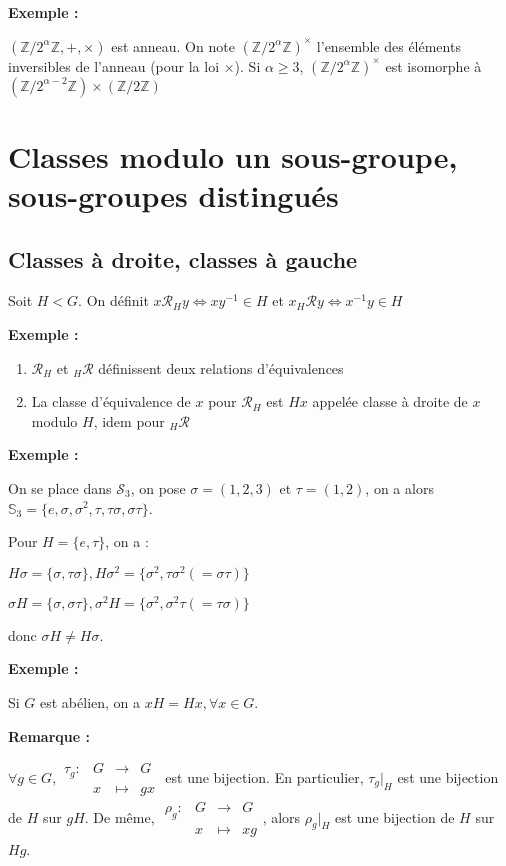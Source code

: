 \documentclass{report}
\newenvironment{exemple}{\begin{tcolorbox}[colback=gray!10,colframe= white]
    \textbf{Exemple :}
     \par}
    {\end{tcolorbox}}
\newcommand{\remarque}{
    \noindent\textbf{Remarque :} \par
}
\newcommand{\fonction}[5]{
    \begin{array}{l|rcl}
    #1: & #2 & \longrightarrow & #3 \\
        & #4 & \longmapsto & #5 
    \end{array}
}
\newcommand{\Z}{\mathbb{Z}}
\begin{document}
\begin{exemple}
$(\Z / 2^{\alpha}\Z,+,\times)$ est anneau. On note $(\Z / 2^{\alpha}\Z)^{\times}$ l'ensemble des éléments inversibles de l'anneau (pour la loi $\times$). Si $\alpha \ge 3$, $(\Z / 2^{\alpha}\Z)^{\times}$ est isomorphe à $(\Z /2^{\alpha -2}\Z)\times(\Z / 2\Z)$
\end{exemple}

\chapter{Classes modulo un sous-groupe, sous-groupes distingués}


\section{Classes à droite, classes à gauche}

Soit $H < G$. On définit $x\mathcal{R}_H y \iff xy^{-1} \in H$ et $x _{H}\mathcal{R} y \iff x^{-1}y \in H$

\begin{exemple}
\begin{enumerate}
    \item $\mathcal{R}_H$ et $_{H}\mathcal{R}$ définissent deux relations d'équivalences
\item La classe d'équivalence de $x$ pour $\mathcal{R}_H$ est $Hx$ appelée classe à droite de $x$ modulo $H$, idem pour $_{H}\mathcal{R}$
\end{enumerate}
\end{exemple}

\begin{exemple}
	On se place dans $\mathcal{S}_3$, on pose $\sigma=(1,2,3)$ et $\tau=(1,2)$, on a alors $\mathbb{S}_3 = \{e,\sigma,\sigma^2,\tau,\tau\sigma,\sigma\tau\}$.\par Pour $H = \{e,\tau \}$, on a :\par
    $H\sigma = \{\sigma, \tau\sigma\}, H\sigma^2 = \{\sigma^2,\tau\sigma^2 (=\sigma\tau)\}$\par
    $\sigma H = \{\sigma,\sigma\tau\},\sigma^2 H = \{\sigma^2,\sigma^2 \tau (=\tau \sigma)\}$\par
    donc $\sigma H \neq H \sigma$.
\end{exemple}

\begin{exemple}
    Si $G$ est abélien, on a $xH = Hx,\forall x \in G$.
\end{exemple}

\remarque
$\forall g \in G, \fonction{\tau_g}{G}{G}{x}{gx}$ est une bijection. En particulier, $\tau_g|_H$ est une bijection de $H$ sur $gH$. De même, $\fonction{\rho_g}{G}{G}{x}{xg}$, alors $\rho_g|_H$ est une bijection de $H$ sur $Hg$.
\end{document}
